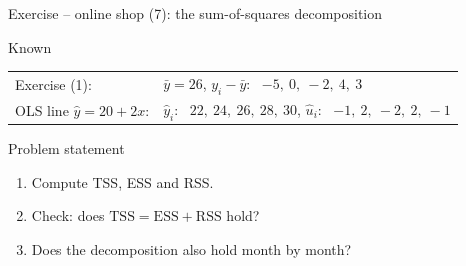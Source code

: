 \documentclass[aspectratio=169,11pt]{beamer}
\begin{document}
\begin{frame}{Exercise -- online shop (7): the sum-of-squares decomposition}
  \begin{block}{Known}
    \renewcommand{\arraystretch}{1.25}
    \begin{tabular}{@{}ll@{}}
      Exercise (1): & $\bar{y} = 26$, \quad $y_i - \bar{y}$: \ $-5,\ 0,\ -2,\ 4,\ 3$ \\
      OLS line $\hat{y} = 20 + 2x$: & $\hat{y}_i$: \ $22,\ 24,\ 26,\ 28,\ 30$, \quad
        $\hat{u}_i$: \ $-1,\ 2,\ -2,\ 2,\ -1$
    \end{tabular}
  \end{block}

  \medskip

  \begin{block}{Problem statement}
    \begin{enumerate}
      \setlength{\itemsep}{2pt}
      \item Compute TSS, ESS and RSS.
      \item Check: does $\text{TSS} = \text{ESS} + \text{RSS}$ hold?
      \item Does the decomposition also hold month by month?
    \end{enumerate}
  \end{block}

  \medskip

  \begin{center}
  \end{center}
\end{frame}
\end{document}
